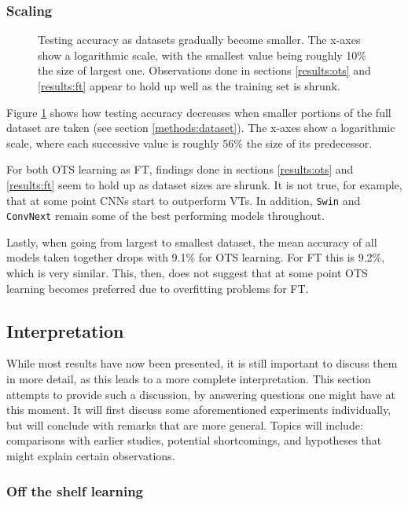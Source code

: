 \subsubsection{Scaling}

\begin{figure}[tb]
    \centering
    \def\svgwidth{\textwidth}
    
    \caption{Testing accuracy as datasets gradually become smaller. The x-axes show a logarithmic scale, with the smallest value being roughly 10\% the size of largest one. Observations done in sections \ref{results:ots} and \ref{results:ft} appear to hold up well as the training set is shrunk.}
    \label{results:img:scale}
\end{figure}

Figure \ref{results:img:scale} shows how testing accuracy decreases when smaller portions of the full dataset are taken (see section \ref{methods:dataset}). The x-axes show a logarithmic scale, where each successive value is roughly 56\% the size of its predecessor.

For both OTS learning as FT, findings done in sections \ref{results:ots} and \ref{results:ft} seem to hold up as dataset sizes are shrunk. It is not true, for example, that at some point CNNs start to outperform VTs. In addition, \texttt{Swin} and \texttt{ConvNext} remain some of the best performing models throughout. 

Lastly, when going from largest to smallest dataset, the mean accuracy of all models taken together drops with 9.1\% for OTS learning. For FT this is 9.2\%, which is very similar. This, then, does not suggest that at some point OTS learning becomes preferred due to overfitting problems for FT.


\subsection{Interpretation} \label{exp:int} %
While most results have now been presented, it is still important to discuss them in more detail, as this leads to a more complete interpretation. This section attempts to provide such a discussion, by answering questions one might have at this moment. It will first discuss some aforementioned experiments individually, but will conclude with remarks that are more general. Topics will include: comparisons with earlier studies, potential shortcomings, and hypotheses that might explain certain observations.

\subsubsection{Off the shelf learning}

